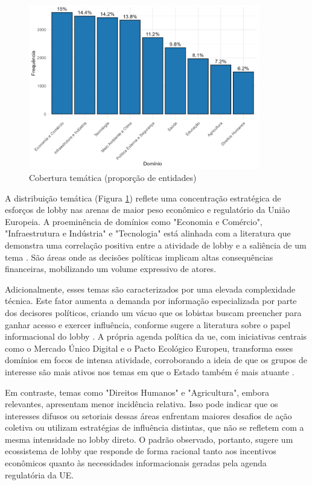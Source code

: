 \begin{figure}[!htbp]
\centering
\includegraphics[width=0.9\textwidth]{figures/descriptives_lobbyists/barplot_domain_distribution.png}
\caption{Cobertura temática (proporção de entidades)}
\label{fig:theme_coverage}
\end{figure}

A distribuição temática (Figura \ref{fig:theme_coverage}) reflete uma concentração estratégica de esforços de lobby nas arenas de maior peso econômico e regulatório da União Europeia. A proeminência de domínios como "Economia e Comércio", "Infraestrutura e Indústria" e "Tecnologia" está alinhada com a literatura que demonstra uma correlação positiva entre a atividade de lobby e a saliência de um tema \cite{caldeira2000lobbying, baumgartner2010agendas}. São áreas onde as decisões políticas implicam altas consequências financeiras, mobilizando um volume expressivo de atores.

Adicionalmente, esses temas são caracterizados por uma elevada complexidade técnica. Este fator aumenta a demanda por informação especializada por parte dos decisores políticos, criando um vácuo que os lobistas buscam preencher para ganhar acesso e exercer influência, conforme sugere a literatura sobre o papel informacional do lobby \cite{kluver_informational_2012}. A própria agenda política da \acrshort{ue}, com iniciativas centrais como o Mercado Único Digital e o Pacto Ecológico Europeu, transforma esses domínios em focos de intensa atividade, corroborando a ideia de que os grupos de interesse são mais ativos nos temas em que o Estado também é mais atuante \cite{mahoney2008brussels}.

Em contraste, temas como "Direitos Humanos" e "Agricultura", embora relevantes, apresentam menor incidência relativa. Isso pode indicar que os interesses difusos ou setoriais dessas áreas enfrentam maiores desafios de ação coletiva ou utilizam estratégias de influência distintas, que não se refletem com a mesma intensidade no lobby direto. O padrão observado, portanto, sugere um ecossistema de lobby que responde de forma racional tanto aos incentivos econômicos quanto às necessidades informacionais geradas pela agenda regulatória da UE.

